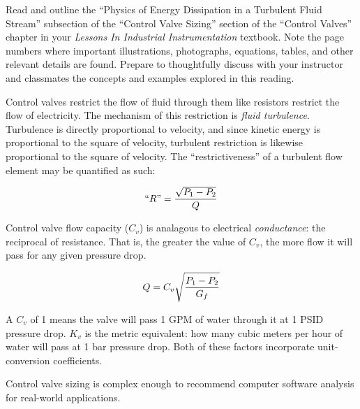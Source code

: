 

Read and outline the ``Physics of Energy Dissipation in a Turbulent Fluid Stream'' subsection of the ``Control Valve Sizing'' section of the ``Control Valves'' chapter in your {\it Lessons In Industrial Instrumentation} textbook.  Note the page numbers where important illustrations, photographs, equations, tables, and other relevant details are found.  Prepare to thoughtfully discuss with your instructor and classmates the concepts and examples explored in this reading.














Control valves restrict the flow of fluid through them like resistors restrict the flow of electricity.  The mechanism of this restriction is {\it fluid turbulence}.  Turbulence is directly proportional to velocity, and since kinetic energy is proportional to the square of velocity, turbulent restriction is likewise proportional to the square of velocity.  The ``restrictiveness'' of a turbulent flow element may be quantified as such:

$$\hbox{``}R\hbox{''} = {\sqrt{P_1 - P_2} \over Q}$$

Control valve flow capacity ($C_v$) is analagous to electrical {\it conductance}: the reciprocal of resistance.  That is, the greater the value of $C_v$, the more flow it will pass for any given pressure drop.

$$Q = C_v \sqrt{P_1 - P_2 \over G_f}$$

A $C_v$ of 1 means the valve will pass 1 GPM of water through it at 1 PSID pressure drop.  $K_v$ is the metric equivalent: how many cubic meters per hour of water will pass at 1 bar pressure drop.  Both of these factors incorporate unit-conversion coefficients.

\vskip 10pt

Control valve sizing is complex enough to recommend computer software analysis for real-world applications.










